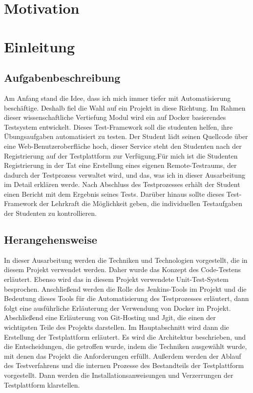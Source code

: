\documentclass[a4paper,12pt,oneside]{book}
\begin{document}
	
\tableofcontents
\newpage
{}
\listoffigures
\newpage
{}
\lstlistoflistings
\newpage
\chapter{Motivation}
\chapter{Einleitung}
\section{Aufgabenbeschreibung}

Am Anfang stand die Idee, dass ich mich immer tiefer mit Automatisierung beschäftige. Deshalb fiel die Wahl auf ein Projekt in diese Richtung.
Im Rahmen dieser wissenschaftliche Vertiefung Modul wird ein auf Docker basierendes Testsystem entwickelt.
Dieses Test-Framework soll die studenten helfen, ihre Übungsaufgaben automatisiert zu testen.
\newline
Der Student lädt seinen Quellcode über eine Web-Benutzeroberfläche hoch, dieser Service steht den Studenten nach der Registrierung auf der Testplattform zur Verfügung.Für mich ist die Studenten Registrierung in der Tat eine Erstellung eines eigenen Remote-Testraums, der dadurch der Testprozess verwaltet wird, und das, was ich in dieser Ausarbeitung im Detail erklären werde. Nach Abschluss des Testprozesses erhält der Student einen Bericht mit dem Ergebnis seines Tests. Darüber hinaus sollte dieses Test-Framework der Lehrkraft  die Möglichkeit geben, die individuellen Testaufgaben der Studenten zu kontrollieren.
\section{Herangehensweise}
In dieser Ausarbeitung werden die Techniken und Technologien vorgestellt, die in diesem Projekt verwendet werden. Daher wurde das Konzept des Code-Testens erläutert. Ebenso wird das in diesem Projekt verwendete Unit-Test-System besprochen. Anschließend werden die Rolle des Jenkins-Tools im Projekt und die Bedeutung dieses Tools für die Automatisierung des Testprozesses erläutert, dann folgt eine ausführliche Erläuterung der Verwendung von Docker im Projekt. Abschließend eine Erläuterung von Git-Hosting und Jgit, die einen der wichtigsten Teile des Projekts darstellen.
\newline
Im Hauptabschnitt wird dann die Erstellung der Testplattform erläutert. Es wird die Architektur beschrieben, und die Entscheidungen, die getroffen wurde, indem die Techniken ausgewählt wurde, mit denen das Projekt die Anforderungen erfüllt. Außerdem werden der Ablauf des Testverfahrens und die internen Prozesse des Bestandteils der Testplattform vorgestellt. Dann werden die Installationsanweisungen und Verzerrungen der Testplattform klarstellen.
\end{document}
